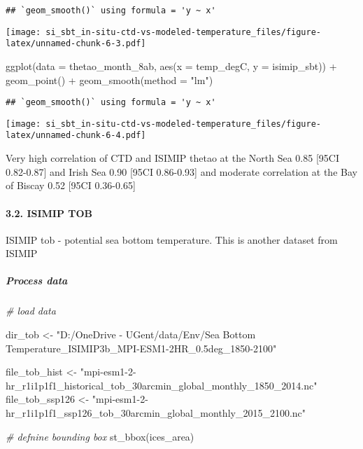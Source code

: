 \documentclass[
]{article}
\newenvironment{Shaded}{\begin{snugshade}}{\end{snugshade}}
\newcommand{\AttributeTok}[1]{\textcolor[rgb]{0.77,0.63,0.00}{#1}}
\newcommand{\CommentTok}[1]{\textcolor[rgb]{0.56,0.35,0.01}{\textit{#1}}}
\newcommand{\FunctionTok}[1]{\textcolor[rgb]{0.00,0.00,0.00}{#1}}
\newcommand{\NormalTok}[1]{#1}
\newcommand{\OtherTok}[1]{\textcolor[rgb]{0.56,0.35,0.01}{#1}}
\newcommand{\SpecialCharTok}[1]{\textcolor[rgb]{0.00,0.00,0.00}{#1}}
\newcommand{\StringTok}[1]{\textcolor[rgb]{0.31,0.60,0.02}{#1}}
\begin{document}
\begin{verbatim}
## `geom_smooth()` using formula = 'y ~ x'
\end{verbatim}

\texttt{[image: si\_sbt\_in-situ-ctd-vs-modeled-temperature\_files/figure-latex/unnamed-chunk-6-3.pdf]}

\begin{Shaded}
\begin{Highlighting}[]
\FunctionTok{ggplot}\NormalTok{(}\AttributeTok{data =}\NormalTok{ thetao\_month\_8ab, }\FunctionTok{aes}\NormalTok{(}\AttributeTok{x =}\NormalTok{ temp\_degC, }\AttributeTok{y =}\NormalTok{ isimip\_sbt)) }\SpecialCharTok{+} \FunctionTok{geom\_point}\NormalTok{() }\SpecialCharTok{+} \FunctionTok{geom\_smooth}\NormalTok{(}\AttributeTok{method =} \StringTok{"lm"}\NormalTok{)}
\end{Highlighting}
\end{Shaded}

\begin{verbatim}
## `geom_smooth()` using formula = 'y ~ x'
\end{verbatim}

\texttt{[image: si\_sbt\_in-situ-ctd-vs-modeled-temperature\_files/figure-latex/unnamed-chunk-6-4.pdf]}

Very high correlation of CTD and ISIMIP thetao at the North Sea 0.85
{[}95CI 0.82-0.87{]} and Irish Sea 0.90 {[}95CI 0.86-0.93{]} and
moderate correlation at the Bay of Biscay 0.52 {[}95CI 0.36-0.65{]}

\hypertarget{isimip-tob}{%
\paragraph{3.2. ISIMIP TOB}\label{isimip-tob}}

ISIMIP tob - potential sea bottom temperature. This is another dataset
from ISIMIP

\hypertarget{process-data-1}{%
\subparagraph{Process data}\label{process-data-1}}

\begin{Shaded}
\begin{Highlighting}[]
\CommentTok{\# load data}

\NormalTok{dir\_tob }\OtherTok{\textless{}{-}} \StringTok{"D:/OneDrive {-} UGent/data/Env/Sea Bottom Temperature\_ISIMIP3b\_MPI{-}ESM1{-}2HR\_0.5deg\_1850{-}2100"}

\NormalTok{file\_tob\_hist }\OtherTok{\textless{}{-}} \StringTok{"mpi{-}esm1{-}2{-}hr\_r1i1p1f1\_historical\_tob\_30arcmin\_global\_monthly\_1850\_2014.nc"}
\NormalTok{file\_tob\_ssp126 }\OtherTok{\textless{}{-}} \StringTok{"mpi{-}esm1{-}2{-}hr\_r1i1p1f1\_ssp126\_tob\_30arcmin\_global\_monthly\_2015\_2100.nc"}

\CommentTok{\# defnine bounding box}
\FunctionTok{st\_bbox}\NormalTok{(ices\_area)}
\end{Highlighting}
\end{Shaded}
\end{document}
